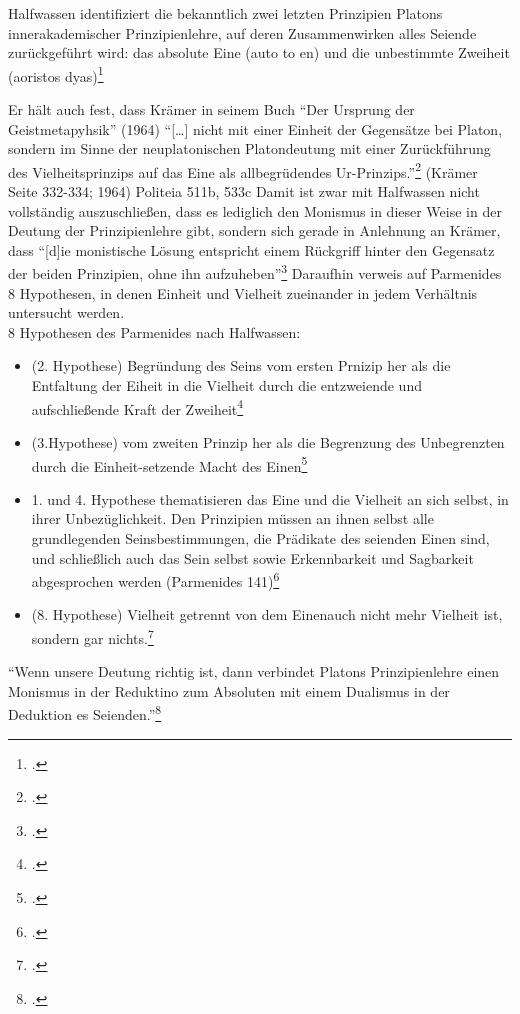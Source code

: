 Halfwassen identifiziert die bekanntlich zwei letzten Prinzipien Platons innerakademischer Prinzipienlehre, auf deren Zusammenwirken alles Seiende zurückgeführt wird: das absolute Eine (auto to en) und die unbestimmte Zweiheit (aoristos dyas)\footcite[vgl.][S. 67]{HalfwassenMonismusDualismus}

Er hält auch fest, dass Krämer in seinem Buch \enquote{Der Ursprung der Geistmetapyhsik} (1964) \enquote{[\dots] nicht mit einer Einheit der Gegensätze bei Platon, sondern im Sinne der neuplatonischen Platondeutung mit einer Zurückführung des Vielheitsprinzips auf das Eine als allbegrüdendes Ur-Prinzips.}\footcite[][S. 68]{HalfwassenMonismusDualismus} (Krämer Seite 332-334; 1964) 
 Politeia 511b, 533c
Damit ist zwar mit Halfwassen nicht vollständig auszuschließen, dass es lediglich den Monismus in dieser Weise in der Deutung der Prinzipienlehre gibt, sondern sich gerade in Anlehnung an Krämer, dass \enquote{[d]ie monistische Lösung entspricht einem Rückgriff hinter den Gegensatz der beiden Prinzipien, ohne ihn aufzuheben}\footcite[vgl.][S. 333]{Krämer1964Geistmetaphysik}
Daraufhin verweis auf Parmenides 8 Hypothesen, in denen Einheit und Vielheit zueinander in jedem Verhältnis untersucht werden.\\
8 Hypothesen des Parmenides nach Halfwassen:
\begin{itemize}
    \item {(2. Hypothese) Begründung des Seins vom ersten Prnizip her als die Entfaltung der Eiheit in die Vielheit durch die entzweiende und aufschließende Kraft der Zweiheit}\footcite[vgl.][S. 72]{HalfwassenMonismusDualismus}
    \item {(3.Hypothese) vom zweiten Prinzip her als die Begrenzung des Unbegrenzten durch die Einheit-setzende Macht des Einen}\footcite[vgl.][S. 72]{HalfwassenMonismusDualismus}
    \item {1. und 4. Hypothese thematisieren das Eine und die Vielheit an sich selbst, in ihrer Unbezüglichkeit. Den Prinzipien müssen an ihnen selbst alle grundlegenden Seinsbestimmungen, die Prädikate des seienden Einen sind, und schließlich auch das Sein selbst sowie Erkennbarkeit und Sagbarkeit abgesprochen werden (Parmenides 141)}\footcite[vgl.][S. 72]{HalfwassenMonismusDualismus}
    \item {(8. Hypothese) Vielheit getrennt von dem Einenauch nicht mehr Vielheit ist, sondern gar nichts.\footcite[vgl.][S. 73]{HalfwassenMonismusDualismus}}
\end{itemize}
\enquote{Wenn unsere Deutung richtig ist, dann verbindet Platons Prinzipienlehre einen Monismus in der Reduktino zum Absoluten mit einem Dualismus in der Deduktion es Seienden.}\footcite[][S. 79]{HalfwassenMonismusDualismus}


